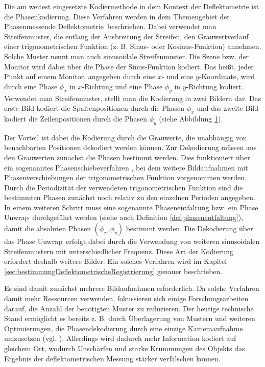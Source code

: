 Die am weitest eingesetzte Kodiermethode in dem Kontext der Deflektometrie ist die Phasenkodierung.
Diese Verfahren werden in dem Themengebiet der \glqq Phasenmessende Deflektometrie\grqq ~beschrieben.
Dabei verwendet man Streifenmuster, die entlang der Ausbreitung der Streifen, den Grauwertverlauf einer trigonometrischen Funktion (z. B. Sinus- oder Kosinus-Funktion) annehmen.
Solche Muster nennt man auch sinusoidale Streifenmuster.
Die Szene bzw. der Monitor wird dabei über die Phase der Sinus-Funktion kodiert.
Das heißt, jeder Punkt auf einem Monitor, angegeben durch eine $x$- und eine $y$-Koordinate, wird durch eine Phase $\phi_x$ in $x$-Richtung und eine Phase $\phi_y$ in $y$-Richtung kodiert.
Verwendet man Streifenmuster, stellt man die Kodierung in zwei Bildern dar.
Das erste Bild kodiert die Spaltenpositionen durch die Phasen $\phi_x$ und das zweite Bild kodiert die Zeilenpositionen durch die Phasen $\phi_y$ (siehe Abbildung \ref{tikz:abbSinusoidaleStreifenmuster}).

\begin{figure}[H]
	\centering
		
		\label{tikz:abbSinusoidaleStreifenmuster}
\end{figure}

\noindent
Der Vorteil ist dabei die Kodierung durch die Grauwerte, die unabhängig von benachbarten Positionen dekodiert werden können.
Zur Dekodierung müssen aus den Grauwerten zunächst die Phasen bestimmt werden.
Dies funktioniert über ein sogenanntes Phasenschiebeverfahren \cite{carre}, bei dem weitere Bildaufnahmen mit Phasenverschiebungen der trigonometrischen Funktion vorgenommen werden.
Durch die Periodizität der verwendeten trigonometrischen Funktion sind die bestimmten Phasen zunächst noch relativ zu den einzelnen Perioden angegeben.
In einem weiteren Schritt muss eine sogenannte Phasenentfaltung bzw. ein \glqq Phase Unwrap\grqq ~durchgeführt werden (siehe auch Definition \ref{def:phasenentfaltung}), damit die absoluten Phasen $\left(\phi_x,\phi_y\right)$ bestimmt werden.
Die Dekodierung über das \glqq Phase Unwrap\grqq ~erfolgt dabei durch die Verwendung von weiteren sinusoidalen Streifenmustern mit unterschiedlicher Frequenz.
Diese Art der Kodierung erfordert deshalb weitere Bilder.
Ein solches Verfahren wird im Kapitel \ref{sec:bestimmungDeflektometrischeRegistrierung} genauer beschrieben.

\p
Es sind damit zunächst mehrere Bildaufnahmen erforderlich.
Da solche Verfahren damit mehr Ressourcen verwenden, fokussieren sich einige Forschungsarbeiten darauf, die Anzahl der benötigten Muster zu reduzieren.
Der heutige technische Stand ermöglicht es bereits z. B. durch Überlagerung von Mustern und weiteren Optimierungen, die Phasendekodierung durch eine einzige Kameraaufnahme umzusetzen (vgl. \cite{waveletPMD}).
Allerdings wird dadurch mehr Information kodiert auf gleichem Ort, wodurch Unschärfen und starke Krümmungen des Objekts das Ergebnis der deflektometrischen Messung stärker verfälschen können.